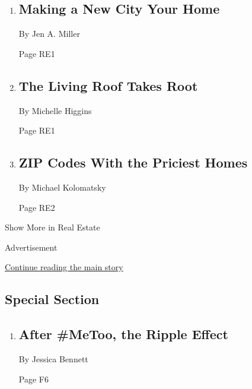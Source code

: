 \begin{enumerate}
\def\labelenumi{\arabic{enumi}.}
\item
  \href{/2018/06/29/realestate/making-a-new-city-your-home.html}{}

  \hypertarget{making-a-new-city-your-home}{%
  \subsection{Making a New City Your
  Home}\label{making-a-new-city-your-home}}

  By Jen A. Miller

  Page RE1
\item
  \href{/2018/06/26/realestate/the-living-roof-takes-root.html}{}

  \hypertarget{the-living-roof-takes-root}{%
  \subsection{The Living Roof Takes
  Root}\label{the-living-roof-takes-root}}

  By Michelle Higgins

  Page RE1
\item
  \href{/2018/06/28/realestate/zip-codes-with-the-priciest-homes.html}{}

  \hypertarget{zip-codes-with-the-priciest-homes}{%
  \subsection{ZIP Codes With the Priciest
  Homes}\label{zip-codes-with-the-priciest-homes}}

  By Michael Kolomatsky

  Page RE2
\end{enumerate}

Show More in Real Estate

Advertisement

\protect\hyperlink{after-mid8}{Continue reading the main story}

\hypertarget{special-section}{%
\subsection{Special Section}\label{special-section}}

\begin{enumerate}
\def\labelenumi{\arabic{enumi}.}
\item
  \href{/2018/06/28/arts/what-is-next-metoo-movement.html}{}

  \hypertarget{after-metoo-the-ripple-effect}{%
  \subsection{After \#MeToo, the Ripple
  Effect}\label{after-metoo-the-ripple-effect}}

  By Jessica Bennett

  Page F6
\end{enumerate}

